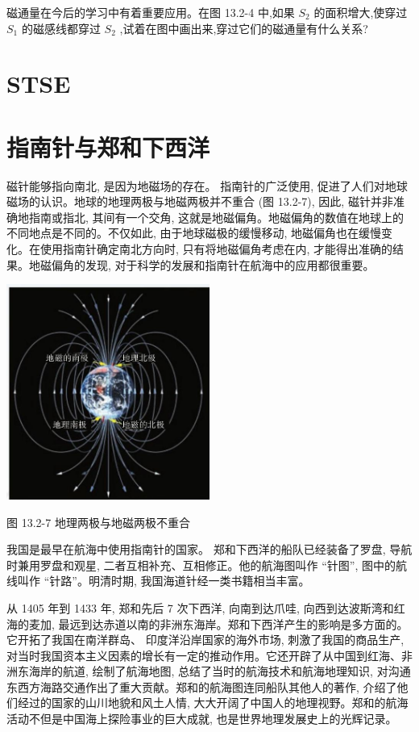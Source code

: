 \documentclass[10pt]{article}
\begin{document}
磁通量在今后的学习中有着重要应用。在图 13.2-4 中,如果 \({S}_{2}\) 的面积增大,使穿过 \({S}_{1}\) 的磁感线都穿过 \({S}_{2}\) ,试着在图中画出来,穿过它们的磁通量有什么关系?

\section*{STSE}

\section*{指南针与郑和下西洋}

磁针能够指向南北, 是因为地磁场的存在。 指南针的广泛使用, 促进了人们对地球磁场的认识。地球的地理两极与地磁两极并不重合 (图 13.2-7), 因此, 磁针并非准确地指南或指北, 其间有一个交角, 这就是地磁偏角。地磁偏角的数值在地球上的不同地点是不同的。不仅如此, 由于地球磁极的缓慢移动, 地磁偏角也在缓慢变化。在使用指南针确定南北方向时, 只有将地磁偏角考虑在内, 才能得出准确的结果。地磁偏角的发现, 对于科学的发展和指南针在航海中的应用都很重要。

\begin{center}
\includegraphics[max width=0.5\textwidth]{images/01911d5f-8e38-70c0-b5b8-2b399bd115b6_117_210509.jpg}
\end{center}

图 13.2-7 地理两极与地磁两极不重合

我国是最早在航海中使用指南针的国家。 郑和下西洋的船队已经装备了罗盘, 导航时兼用罗盘和观星, 二者互相补充、互相修正。他的航海图叫作 “针图”, 图中的航线叫作 “针路”。明清时期, 我国海道针经一类书籍相当丰富。

从 1405 年到 1433 年, 郑和先后 7 次下西洋, 向南到达爪哇, 向西到达波斯湾和红海的麦加, 最远到达赤道以南的非洲东海岸。郑和下西洋产生的影响是多方面的。它开拓了我国在南洋群岛、 印度洋沿岸国家的海外市场, 刺激了我国的商品生产, 对当时我国资本主义因素的增长有一定的推动作用。它还开辟了从中国到红海、非洲东海岸的航道, 绘制了航海地图, 总结了当时的航海技术和航海地理知识, 对沟通东西方海路交通作出了重大贡献。郑和的航海图连同船队其他人的著作, 介绍了他们经过的国家的山川地貌和风土人情, 大大开阔了中国人的地理视野。郑和的航海活动不但是中国海上探险事业的巨大成就, 也是世界地理发展史上的光辉记录。
\end{document}
